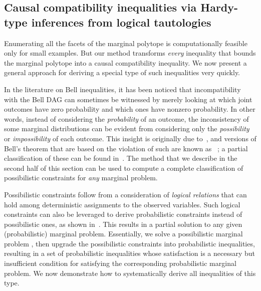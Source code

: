 \documentclass[aps,english,superscriptaddress,onecolumn,twoside,longbibliography,pra,floatfix,fleqn,nofootinbib]{revtex4-1}%
\newcommand*{\tblue}[1]{{\color{MidnightBlue}{\textbf{#1}}}}
\theoremstyle{definition}
\newcounter{example}[section]
\begin{document}
\subsection{Causal compatibility inequalities via Hardy-type inferences from logical tautologies}\label{sec:TSEM}

Enumerating all the facets of the marginal polytope is computationally feasible only for small examples. But our method transforms \emph{every} inequality that bounds the marginal polytope into a causal compatibility inequality. We now present a general approach for deriving a special type of such inequalities very quickly.

In the literature on Bell inequalities, it has been noticed that incompatibility with the Bell DAG can sometimes be witnessed by merely looking at which joint outcomes have zero probability and which ones have nonzero probability. In other words, instead of considering the \emph{probability} of an outcome, the inconsistency of some marginal distributions can be evident from considering only the \emph{possibility} or \emph{impossibility} of each outcome. This insight is originally due to~\citet{L.Hardy:PRL:1665}, and versions of Bell's theorem that are based on the violation of such \tblue{possibilistic constraints} are known as \tblue{Hardy-type paradoxes}~\cite{Garuccio95,CabelloHardyInequality,Braun08,Mancinska14,LSW}; a partial classification of these can be found in~\cite{Mansfield2012}. The method that we describe in the second half of this section can be used to compute a complete classification of possibilistic constraints for \emph{any} marginal problem.

Possibilistic constraints follow from a consideration of {\em logical relations} that can hold among deterministic assignments to the observed variables. Such logical constraints can also be leveraged to derive probabilistic constraints instead of possibilistic ones, as shown in~\cite{Pitowsky1989,Ghirardi08}. This results in a partial solution to any given (probabilistic) marginal problem. Essentially, we solve a possibilistic marginal problem \cite{Mansfield2012}, then upgrade the possibilistic constraints into probabilistic inequalities, resulting in a set of probabilistic inequalities whose satisfaction is a necessary but insufficient condition for satisfying the corresponding probabilistic marginal problem. We now demonstrate how to systematically derive all inequalities of this type.
\end{document}
